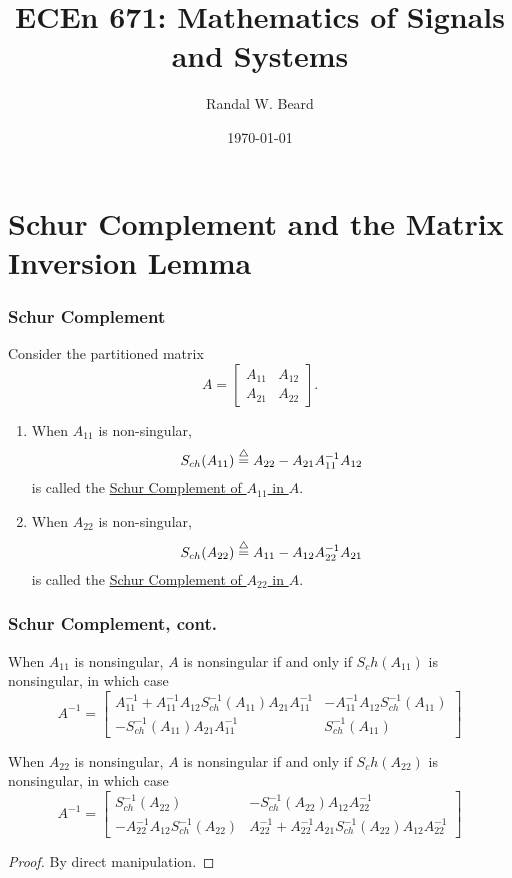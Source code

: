 \documentclass{beamer}
\title{ECEn 671: Mathematics of Signals and Systems}
\author{Randal W. Beard}
\institute{Brigham Young University}
\date{\today}
\begin{document}
\begin{frame}
	\titlepage
\end{frame}

\section{Schur Complement and the Matrix Inversion Lemma}
\frame{\sectionpage}

\begin{frame}\frametitle{Schur Complement}
	\begin{definition}
		Consider the partitioned matrix
		\[
		A = \begin{bmatrix} A_{11} & A_{12} \\ A_{21} & A_{22} \end{bmatrix}.
		\]	
		\begin{enumerate}
			\item When $A_{11}$ is non-singular, 
				\[ S_{ch}(A_{11}) \stackrel{\triangle}{=} A_{22} - A_{21}A_{11}^{-1}A_{12} \]
				is called the \underline{Schur Complement of $A_{11}$ in $A$}.
			\item When $A_{22}$ is non-singular, 
				\[ S_{ch}(A_{22}) \stackrel{\triangle}{=} A_{11} - A_{12}A_{22}^{-1}A_{21} \]
				is called the \underline{Schur Complement of $A_{22}$ in $A$}.
		\end{enumerate}
	\end{definition}
\end{frame}

\begin{frame}\frametitle{Schur Complement, cont.}
	\begin{lemma}
	When $A_{11}$ is nonsingular, $A$ is nonsingular if and only if $S_ch(A_{11})$ is nonsingular, in which case
	\[
	A^{-1} = \begin{bmatrix}
				A_{11}^{-1} + A_{11}^{-1}A_{12}S_{ch}^{-1}(A_{11})A_{21}A_{11}^{-1} &
				-A_{11}^{-1}A_{12}S_{ch}^{-1}(A_{11}) \\
				-S_{ch}^{-1}(A_{11})A_{21}A_{11}^{-1} &
				S_{ch}^{-1}(A_{11})
 			 \end{bmatrix}
	\]	
	\end{lemma}
	\begin{lemma}
	When $A_{22}$ is nonsingular, $A$ is nonsingular if and only if $S_ch(A_{22})$ is nonsingular, in which case
	\[
	A^{-1} = \begin{bmatrix}
				S_{ch}^{-1}(A_{22}) &
				-S_{ch}^{-1}(A_{22})A_{12}A_{22}^{-1} \\
				-A_{22}^{-1}A_{12}S_{ch}^{-1}(A_{22}) &
				A_{22}^{-1} + A_{22}^{-1}A_{21}S_{ch}^{-1}(A_{22})A_{12}A_{22}^{-1} 
 			 \end{bmatrix}
	\]	
	\end{lemma}
	\begin{proof}
	By direct manipulation.	
	\end{proof}
\end{frame}
\end{document}
